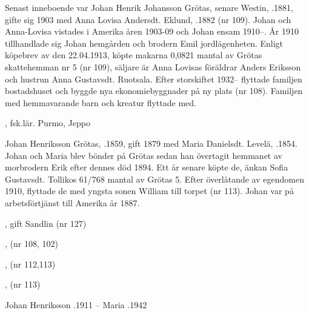 Senast inneboende var Johan Henrik Johansson Grötas, senare Westin, .1881, gifte sig 1903 med Anna Lovisa Andersdt. Eklund, .1882 (nr 109). Johan och Anna-Lovisa vistades i Amerika åren 1903-09 och Johan ensam 1910--. År 1910 tillhandlade sig Johan hemgården och brodern Emil jordlägenheten. Enligt köpebrev av den 22.04.1913, köpte makarna 0,0821 mantal av Grötas skattehemman nr 5 (nr 109), säljare är Anna Lovisas föräldrar Anders Eriksson och hustrun Anna Gustavsdt. Ruotsala. Efter storskiftet 1932-- flyttade familjen bostadshuset och byggde nya ekonomiebyggnader på ny plats (nr 108). Familjen med hemmavarande barn och kreatur flyttade med.
\begin{jhchildren}
  \item {}, fsk.lär. Purmo, Jeppo
  \item {}
  \item {}
  \item {}
  \item {}
  \item {}
  \item {}
  \item {}
  \item {}
  \item {}
\end{jhchildren}


Johan Henriksson Grötas, .1859, gift 1879 med Maria Danielsdt. Levelä, .1854. Johan och Maria blev bönder på Grötas sedan han övertagit hemmanet av morbrodern Erik efter dennes död 1894. Ett år senare köpte de, änkan Sofia Gustavsdt. Tollikos 61/768 mantal av Grötas 5.  Efter överlåtande av egendomen 1910, flyttade de med yngsta sonen William till torpet (nr 113). Johan var på arbetsförtjänst till Amerika år 1887.
\begin{jhchildren}
  \item {}, gift Sandlin (nr 127)
  \item {}, (nr 108, 102)
  \item {}, (nr 112,113)
  \item {}
  \item {}, (nr 113)
\end{jhchildren}
Johan Henriksson .1911  --  Maria .1942


